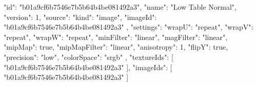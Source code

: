 {
  "id": "b01a9cf6b7546e7b5b64b4be081492a3",
  "name": "Low Table Normal",
  "version": 1,
  "source": {
    "kind": "image",
    "imageId": "b01a9cf6b7546e7b5b64b4be081492a3"
  },
  "settings": {
    "wrapU": "repeat",
    "wrapV": "repeat",
    "wrapW": "repeat",
    "minFilter": "linear",
    "magFilter": "linear",
    "mipMap": true,
    "mipMapFilter": "linear",
    "anisotropy": 1,
    "flipY": true,
    "precision": "low",
    "colorSpace": "srgb"
  },
  "textureIds": [
    "b01a9cf6b7546e7b5b64b4be081492a3"
  ],
  "imageIds": [
    "b01a9cf6b7546e7b5b64b4be081492a3"
  ]
}
